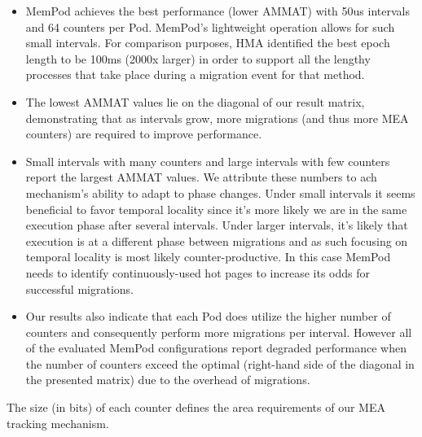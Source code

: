 \begin{itemize}[leftmargin=0.4cm]
\setlength\itemsep{0em}
	\item MemPod achieves the best performance (lower AMMAT) with 50us intervals and 64 counters per Pod. MemPod's lightweight operation allows for such small intervals. For comparison purposes, HMA \cite{meswani-HPCA21} identified the best epoch length to be 100ms (2000x larger) in order to support all the lengthy processes that take place during a migration event for that method.
	\item The lowest AMMAT values lie on the diagonal of our result matrix, demonstrating that as intervals grow, more migrations (and thus more MEA counters) are required to improve performance.
	\item Small intervals with many counters and large intervals with few counters report the largest AMMAT values. We attribute these numbers to ach mechanism's ability to adapt to phase changes. Under small intervals it seems beneficial to favor temporal locality since it's more likely we are in the same execution phase after several intervals. Under larger intervals, it's likely that execution is at a different phase between migrations and as such focusing on temporal locality is most likely counter-productive. In this case MemPod needs to identify continuously-used hot pages to increase its odds for successful migrations.
	\item Our results also indicate that each Pod does utilize the higher number of counters and consequently perform more migrations per interval. However all of the evaluated MemPod configurations report degraded performance when the number of counters exceed the optimal (right-hand side of the diagonal in the presented matrix) due to the overhead of migrations. 
\end{itemize}

The size (in bits) of each counter defines the area requirements of our MEA tracking mechanism.  

